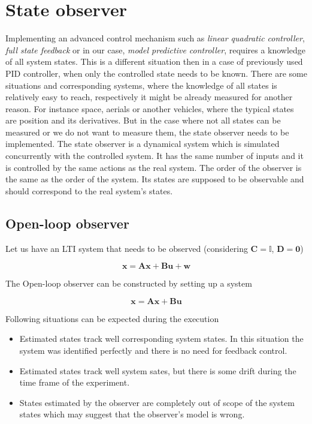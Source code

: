 \section{State observer}

Implementing an advanced control mechanism such as \textit{linear quadratic controller}, \textit{full state feedback} or in our case, \textit{model predictive controller}, requires a knowledge of all system states. This is a different situation then in a case of previously used PID controller, when only the controlled state needs to be known. There are some situations and corresponding systems, where the knowledge of all states is relatively easy to reach, respectively it might be already measured for another reason. For instance space, aerials or another vehicles, where the typical states are position and its derivatives. But in the case where not all states can be measured or we do not want to measure them, the state observer needs to be implemented. The state observer is a dynamical system which is simulated concurrently with the controlled system. It has the same number of inputs and it is controlled by the same actions as the real system. The order of the observer is the same as the order of the system. Its states are supposed to be observable and should correspond to the real system's states.

\subsection{Open-loop observer}

Let us have an LTI system that needs to be observed (considering $\textbf{C} = \mathbb{I}$, $\textbf{D} = \mathbf{0}$)

\begin{equation}
\textbf{x} = \textbf{A}\textbf{x} + \textbf{B}\textbf{u} + \textbf{w}
\end{equation}

The Open-loop observer can be constructed by setting up a system

\begin{equation}
\textbf{\^x} = \textbf{A}\textbf{\^x} + \textbf{B}\textbf{u}
\end{equation}

Following situations can be expected during the execution

\begin{itemize}
\item Estimated states track well corresponding system states. In this situation the system was identified perfectly and there is no need for feedback control.
\item Estimated states track well system sates, but there is some drift during the time frame of the experiment.
\item States estimated by the observer are completely out of scope of the system states which may suggest that the observer's model is wrong.
\end{itemize}

